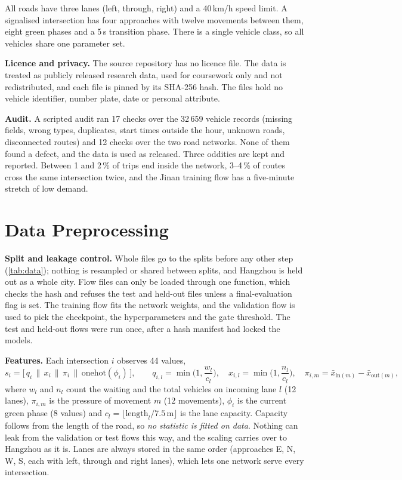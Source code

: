 All roads have three lanes (left, through, right) and a 40\,km/h speed limit. A signalised
intersection has four approaches with twelve movements between them, eight green phases and a
5\,s transition phase. There is a single vehicle class, so all vehicles share one parameter set.

\textbf{Licence and privacy.} The source repository has no licence file. The data is treated
as publicly released research data, used for coursework only and not redistributed, and
each file is pinned by its SHA-256 hash. The files hold no vehicle identifier, number plate,
date or personal attribute.

\textbf{Audit.} A scripted audit ran 17 checks over the 32\,659 vehicle records (missing
fields, wrong types, duplicates, start times outside the hour, unknown roads, disconnected
routes) and 12 checks over the two road networks. None of them found a defect, and the data is
used as released. Three oddities are kept and reported. Between 1 and 2\,\% of trips end inside
the network, 3--4\,\% of routes cross the same intersection twice, and the Jinan training flow
has a five-minute stretch of low demand.

\section{Data Preprocessing}
\label{sec:prep}

\textbf{Split and leakage control.} Whole files go to the splits before any other step
(\cref{tab:data}); nothing is resampled or shared between splits, and Hangzhou is held out as a
whole city. Flow files can only be loaded through one function, which checks the hash and
refuses the test and held-out files unless a final-evaluation flag is set. The training flow
fits the network weights, and the validation flow is used to pick the checkpoint, the
hyperparameters and the gate threshold. The test and held-out flows were run once, after a hash
manifest had locked the models.

\textbf{Features.} Each intersection $i$ observes 44 values,
\begin{equation}
s_i=\big[\,q_i \,\|\, x_i \,\|\, \pi_i \,\|\, \mathrm{onehot}(\phi_i)\,\big],\qquad
q_{i,l}=\min\!\Big(1,\frac{w_l}{c_l}\Big),\quad
x_{i,l}=\min\!\Big(1,\frac{n_l}{c_l}\Big),\quad
\pi_{i,m}=\bar x_{\mathrm{in}(m)}-\bar x_{\mathrm{out}(m)},
\label{eq:state}
\end{equation}
where $w_l$ and $n_l$ count the waiting and the total vehicles on incoming lane $l$ (12
lanes), $\pi_{i,m}$ is the pressure of movement $m$ (12 movements), $\phi_i$ is the current
green phase (8 values) and $c_l=\lfloor \mathrm{length}_l/7.5\,\mathrm{m}\rfloor$ is the lane
capacity. Capacity follows from the length of the road, so \emph{no statistic is fitted on
data}. Nothing can leak from the validation or test flows this way, and the scaling carries
over to Hangzhou as it is. Lanes are always stored in the same order (approaches E, N, W, S,
each with left, through and right lanes), which lets one network serve every intersection.

